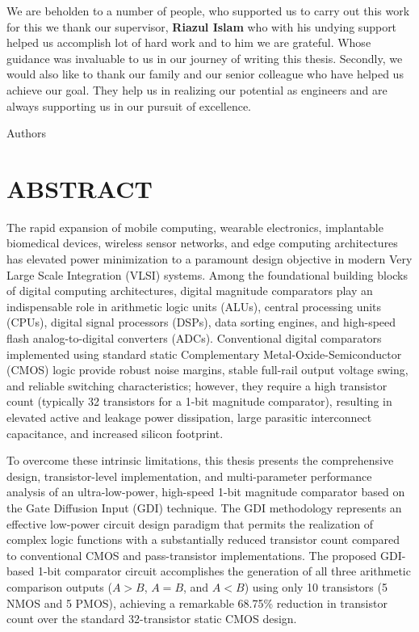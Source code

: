 \documentclass[12pt,a4paper,oneside]{report}
\begin{document}
\vspace{0.4cm}
\noindent We are beholden to a number of people, who supported us to carry out this work for this we thank our supervisor, \textbf{Riazul Islam} who with his undying support helped us accomplish lot of hard work and to him we are grateful. Whose guidance was invaluable to us in our journey of writing this thesis. Secondly, we would also like to thank our family and our senior colleague who have helped us achieve our goal. They help us in realizing our potential as engineers and are always supporting us in our pursuit of excellence.

\vspace{1.5cm}
\noindent Authors

\clearpage

\chapter*{ABSTRACT}

\noindent The rapid expansion of mobile computing, wearable electronics, implantable biomedical devices, wireless sensor networks, and edge computing architectures has elevated power minimization to a paramount design objective in modern Very Large Scale Integration (VLSI) systems. Among the foundational building blocks of digital computing architectures, digital magnitude comparators play an indispensable role in arithmetic logic units (ALUs), central processing units (CPUs), digital signal processors (DSPs), data sorting engines, and high-speed flash analog-to-digital converters (ADCs). Conventional digital comparators implemented using standard static Complementary Metal-Oxide-Semiconductor (CMOS) logic provide robust noise margins, stable full-rail output voltage swing, and reliable switching characteristics; however, they require a high transistor count (typically 32 transistors for a 1-bit magnitude comparator), resulting in elevated active and leakage power dissipation, large parasitic interconnect capacitance, and increased silicon footprint.

\noindent To overcome these intrinsic limitations, this thesis presents the comprehensive design, transistor-level implementation, and multi-parameter performance analysis of an ultra-low-power, high-speed 1-bit magnitude comparator based on the Gate Diffusion Input (GDI) technique. The GDI methodology represents an effective low-power circuit design paradigm that permits the realization of complex logic functions with a substantially reduced transistor count compared to conventional CMOS and pass-transistor implementations. The proposed GDI-based 1-bit comparator circuit accomplishes the generation of all three arithmetic comparison outputs ($A>B$, $A=B$, and $A<B$) using only 10 transistors (5 NMOS and 5 PMOS), achieving a remarkable 68.75\% reduction in transistor count over the standard 32-transistor static CMOS design.
\end{document}
